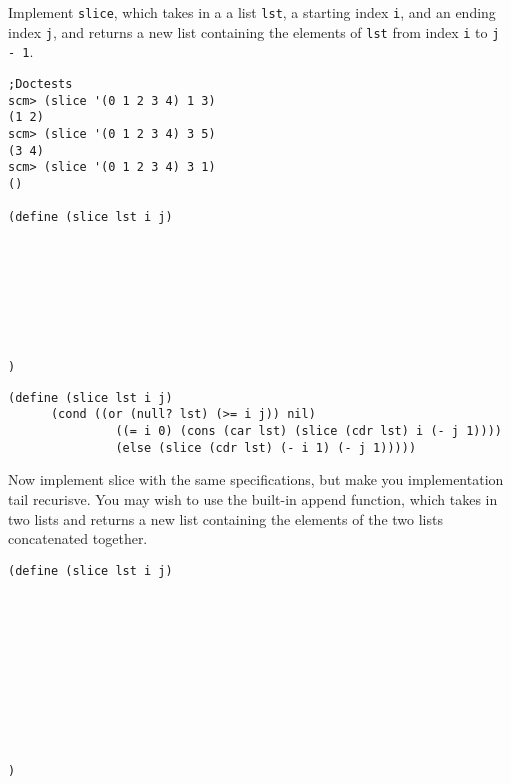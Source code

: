 \begin{blocksection}

\question Implement \texttt{slice}, which takes in a a list \texttt{lst}, a starting index \texttt{i}, and an ending index \texttt{j},
and returns a new list containing the elements of \texttt{lst} from index \texttt{i} to \texttt{j - 1}.

\begin{lstlisting}
;Doctests
scm> (slice '(0 1 2 3 4) 1 3)
(1 2)
scm> (slice '(0 1 2 3 4) 3 5)
(3 4)
scm> (slice '(0 1 2 3 4) 3 1)
()

(define (slice lst i j)
    







)
\end{lstlisting}

\end{blocksection}
\begin{blocksection}

\begin{solution}
\begin{lstlisting}
(define (slice lst i j)
      (cond ((or (null? lst) (>= i j)) nil)
               ((= i 0) (cons (car lst) (slice (cdr lst) i (- j 1))))
               (else (slice (cdr lst) (- i 1) (- j 1)))))
\end{lstlisting}
\end{solution}

\end{blocksection}
\begin{blocksection}

\question Now implement slice with the same specifications, but make you implementation tail recurisve.
\newline
You may wish to use the built-in append function, which takes in two lists and returns a 
new list containing the elements of the two lists concatenated together.

\begin{lstlisting}
(define (slice lst i j)
    










)
\end{lstlisting}
\end{blocksection}

